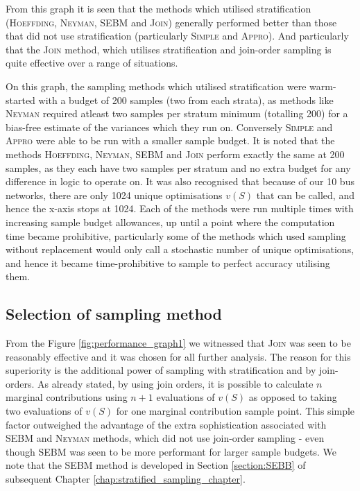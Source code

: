 From this graph it is seen that the methods which utilised stratification (\textsc{Hoeffding}, \textsc{Neyman}, \textsc{SEBM} and \textsc{Join})  generally performed better than those that did not use stratification (particularly \textsc{Simple} and \textsc{Appro}).
And particularly that the \textsc{Join} method, which utilises stratification and join-order sampling is quite effective over a range of situations.

On this graph, the sampling methods which utilised stratification were warm-started with a budget of 200 samples (two from each strata), as methods like \textsc{Neyman} required atleast two samples per stratum minimum (totalling 200) for a bias-free estimate of the variances which they run on.
Conversely \textsc{Simple} and \textsc{Appro} were able to be run with a smaller sample budget.
It is noted that the methods \textsc{Hoeffding}, \textsc{Neyman}, \textsc{SEBM} and \textsc{Join} perform exactly the same at 200 samples, as they each have two samples per stratum and no extra budget for any difference in logic to operate on.
It was also recognised that because of our 10 bus networks, there are only 1024 unique optimisations $v(S)$ that can be called, and hence the x-axis stops at 1024.
Each of the methods were run multiple times with increasing sample budget allowances, up until a point where the computation time became prohibitive, particularly some of the methods which used sampling without replacement would only call a stochastic number of unique optimisations, and hence it became time-prohibitive to sample to perfect accuracy utilising them.

\subsection{Selection of sampling method}\label{subsection:selection_of_sampling_method}

From the Figure \ref{fig:performance_graph1} we witnessed that \textsc{Join} was seen to be reasonably effective and it was chosen for all further analysis.
The reason for this superiority is the additional power of sampling with stratification and by join-orders.
As already stated, by using join orders, it is possible to calculate $n$ marginal contributions using $n+1$ evaluations of $v(S)$ as opposed to taking two evaluations of $v(S)$ for one marginal contribution sample point.
This simple factor outweighed the advantage of the extra sophistication associated with \textsc{SEBM} and \textsc{Neyman} methods, which did not use join-order sampling - even though SEBM was seen to be more performant for larger sample budgets.
We note that the \textsc{SEBM} method is developed in Section \ref{section:SEBB} of subsequent Chapter \ref{chap:stratified_sampling_chapter}.

